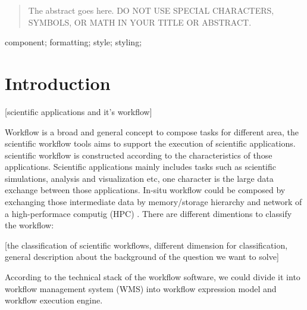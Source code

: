 \documentclass[10pt, conference, compsocconf]{IEEEtran}
\begin{document}
\maketitle


\begin{abstract}
The abstract goes here. DO NOT USE SPECIAL CHARACTERS, SYMBOLS, OR MATH IN YOUR TITLE OR ABSTRACT.

\end{abstract}

\begin{IEEEkeywords}
component; formatting; style; styling;

\end{IEEEkeywords}


%
\IEEEpeerreviewmaketitle



\section{Introduction}

[scientific applications and it's workflow]


Workflow is a broad and general concept to compose tasks for different area, the scientific workflow tools aims to support the execution of scientific applications. scientific workflow is constructed according to the characteristics of those applications. Scientific applications mainly includes tasks such as scientific simulations, analysis and visualization etc, one character is the large data exchange between those applications. In-situ workflow could be composed by exchanging those intermediate data by memory/storage hierarchy and network of a high-performace computig (HPC) \cite{deelman2018future}. There are different dimentions to classify the workflow: 


[the classification of scientific workflows, different dimension for classification, general description about the background of the question we want to solve]

According to the technical stack of the workflow software, we could divide it into workflow management system (WMS) into workflow expression model and workflow execution engine.
\end{document}
